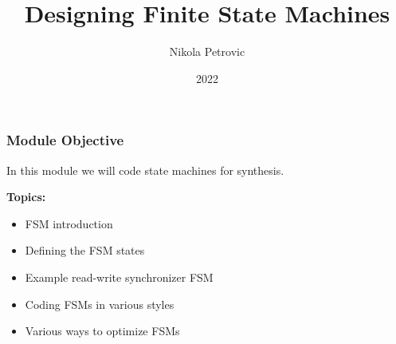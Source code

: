 \documentclass[t, notes, xcolor=table]{beamer}
\title{Designing Finite State Machines}
\author{Nikola Petrovic}
\institute{University of Belgrade, School of Electrical Engineering}
\date{2022}
\begin{document}
\frame{\titlepage}

\begin{frame}
\frametitle{Module Objective}
In this module we will code state machines for synthesis.
\newline

\textbf{Topics:}
\begin{itemize}
\item FSM introduction
\item Defining the FSM states
\item Example read-write synchronizer FSM
\item Coding FSMs in various styles
\item Various ways to optimize FSMs
\end{itemize}
\end{frame}
\end{document}
